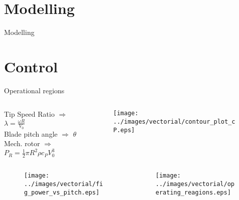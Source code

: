 \section{Modelling}
\begin{frame}{Modelling}
  
\end{frame}

                                   
\section{Control}
\begin{frame}{Operational regions}

  \begin{columns}

    \begin{column}{0.5\columnwidth}
      Tip Speed Ratio $\Rightarrow$ $\lambda=\frac{\omega R}{V_0}$\\
      Blade pitch angle $\Rightarrow$ $\theta$\\
      Mech. rotor $\Rightarrow$ $P_R = \frac{1}{2}\pi R^2 \rho c_{P} V_0^3$
    \end{column}

    \begin{column}{0.5\columnwidth}
      \begin{figure}
        \centering
        \texttt{[image: ../images/vectorial/contour\_plot\_cP.eps]}
      \end{figure}
    \end{column}
    
  \end{columns}

\begin{columns}
  \begin{column}{0.5\columnwidth}
    \begin{figure}
      \centering
      \texttt{[image: ../images/vectorial/fig\_power\_vs\_pitch.eps]}
    \end{figure}
  \end{column}
  \begin{column}{0.5\columnwidth}
    \begin{figure}[H]
      \centering
      \texttt{[image: ../images/vectorial/operating\_reagions.eps]}
    \end{figure}
  \end{column}
\end{columns}
\end{frame}


